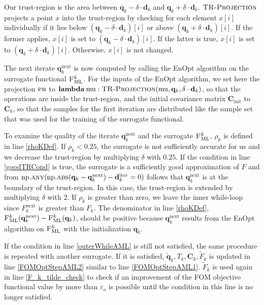 Our trust-region is the area between $\mathbf{q}_k-\delta\cdot\mathbf{d}_k$ and $\mathbf{q}_k+\delta\cdot\mathbf{d}_k$. $\textproc{TR-Projection}$ projects a point $x$ into the trust-region by checking for each element $x[i]$ individually if it lies below $(\mathbf{q}_k-\delta\cdot\mathbf{d}_k)[i]$ or above $(\mathbf{q}_k+\delta\cdot\mathbf{d}_k)[i]$. If the former applies, $x[i]$ is set to $(\mathbf{q}_k-\delta\cdot\mathbf{d}_k)[i]$. If the latter is true, $x[i]$ is set to $(\mathbf{q}_k+\delta\cdot\mathbf{d}_k)[i]$. Otherwise, $x[i]$ is not changed.

The next iterate $\mathbf{q}^\mathrm{next}_k$ is now computed by calling the EnOpt algorithm on the surrogate functional $\textproc{F$_\mathrm{ML}^k$}$. For the inputs of the EnOpt algorithm, we set here the projection $\textproc{pr}$ to $\mathbf{lambda}\:\mathrm{mu}:\protect\Call{TR-Projection}{\mathrm{mu}, \mathbf{q}_k, \delta\cdot\mathbf{d}_k}$, so that the operations are inside the trust-region, and the initial covariance matrix $\mathbf{C}_\mathrm{init}$ to $\mathbf{C}_k$, so that the samples for the first iteration are distributed like the sample set that was used for the training of the surrogate functional.

To examine the quality of the iterate $\mathbf{q}^\mathrm{next}_k$ and the surrogate $\textproc{F$_\mathrm{ML}^k$}$, $\rho_k$ is defined in line \ref{rhoKDef}. If $\rho_k<0.25$, the surrogate is not sufficiently accurate for us and we decrease the trust-region by multiplying $\delta$ with $0.25$. If the condition in line \ref{goodTRCond} is true, the surrogate is a sufficiently good approximation of $F$ and from $\mathrm{np.}\Call{any}{\mathrm{np.}\protect\Call{abs}{\mathbf{q}_k-\mathbf{q}^\mathrm{next}_k}-\mathbf{d}^\mathrm{iter}_k = 0}$ follows that $\mathbf{q}^\mathrm{next}_k$ is at the boundary of the trust-region. In this case, the trust-region is extended by multiplying $\delta$ with $2$. If $\rho_k$ is greater than zero, we leave the inner while-loop since $F^\mathrm{next}_k$ is greater than $F_k$. The denominator in line \ref{rhoKDef}, $\Call{F$_\mathrm{ML}^k$}{\mathbf{q}^\mathrm{next}_k}-\Call{F$_\mathrm{ML}^k$}{\mathbf{q}_k}$, should be positive because $\mathbf{q}^\mathrm{next}_k$ results from the EnOpt algorithm on $\textproc{F$_\mathrm{ML}^k$}$ with the initialization $\mathbf{q}_k$.

If the condition in line \ref{outerWhileAML} is still not satisfied, the same procedure is repeated with another surrogate. If it is satisfied, $\tilde{\mathbf{q}}_k,T_k,\mathbf{C}_k,\tilde{F}_k$ is updated in line \ref{FOMOptStepAML2} similar to line \ref{FOMOptStepAML1}. $\tilde{F}_k$ is used again in line \ref{F_k_tilde_check} to check if an improvement of the FOM objective functional value by more than $\varepsilon_o$ is possible until the condition in this line is no longer satisfied.\\

